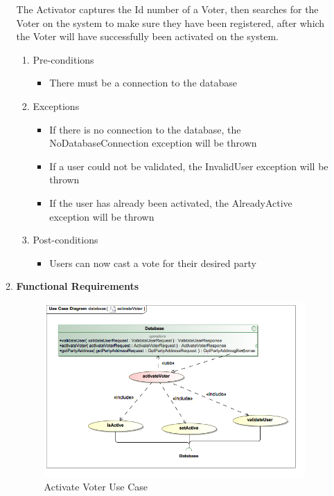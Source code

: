 \begin{enumerate}
\begin{enumerate}
			The Activator captures the Id number of a Voter, then searches for the Voter on the system to make sure they have been registered, after which the Voter will have successfully been activated on the system.
			\newline
			
			\begin{enumerate}
				\item Pre-conditions
				\begin{itemize}
					\item There must be a connection to the database
				\end{itemize}
				
				\item Exceptions
				\begin{itemize}
						\item If there is no connection to the database, the NoDatabaseConnection exception will be thrown
						\item If a user could not be validated, the InvalidUser exception will be thrown
						\item If the user has already been activated, the AlreadyActive exception will be thrown
				\end{itemize}
				
				\item Post-conditions
				\begin{itemize}
					\item Users can now cast a vote for their desired party
				\end{itemize}
			\end{enumerate}
			
			\newpage
			
			\item \textbf{Functional Requirements}
			\begin{figure}[H]
				\centering
				\includegraphics[width=0.75\linewidth]{../Images/Database/UseCases/ActivateVoter_UseCase.png}
				\caption{Activate Voter Use Case}
			\end{figure}
			

\end{enumerate}
\end{enumerate}
